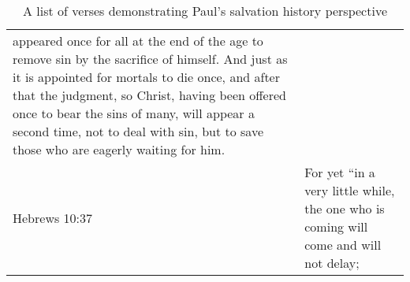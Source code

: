 \begin{table}
\begin{center}
\begin{tabulary}{\linewidth}{lL}
appeared once for all at the end of the age to remove sin by the sacrifice of 
himself. And just as it is appointed for mortals to die once, and after that 
the judgment, so Christ, having been offered once to bear the sins of many, 
will appear a second time, not to deal with sin, but to save those who are 
eagerly waiting for him. \\
Hebrews 10:37 & For yet ``in a very little while, the one who is 
coming will come and will not delay; \\
            \bottomrule
        \end{tabulary}
    \end{center}
    \caption{A list of verses demonstrating Paul's salvation history perspective}
    \label{tab:shp-paul}
\end{table}

